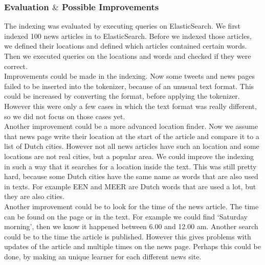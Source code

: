 \subsubsection*{Evaluation $\&$ Possible Improvements }
The indexing was evaluated by executing queries on ElasticSearch. 
We first indexed 100 news articles in to ElasticSearch.
Before we indexed those articles, we defined their locations and defined which articles contained certain words.
Then we executed queries on the locations and words and checked if they were correct. \\
Improvements could be made in the indexing. Now some tweets and news pages failed to be inserted into the tokenizer, because of an unusual text format. 
This could be increased by converting the format, before applying the tokenizer. 
However this were only a few cases in which the text format was really different, so we did not focus on those cases yet. \\
Another improvement could be a more advanced location finder. 
Now we assume that news page write their location at the start of the article and compare it to a list of Dutch cities.
However not all news articles have such an location and some locations are not real cities, but a popular area. 
We could improve the indexing in such a way that it searches for a location inside the text. This was still pretty hard, because some Dutch cities have the same name as words that are also used in texts. For example EEN and MEER are Dutch words that are used a lot, but they are also cities. \\
Another improvement could be to look for the time of the news article. The time can be found on the page or in the text. 
For example we could find `Saturday morning', then we know it happened between 6.00 and 12.00 am. 
Another search could be to the time the article is published. 
However this gives problems with updates of the article and multiple times on the news page. 
Perhaps this could be done, by making an unique learner for each different news site. 